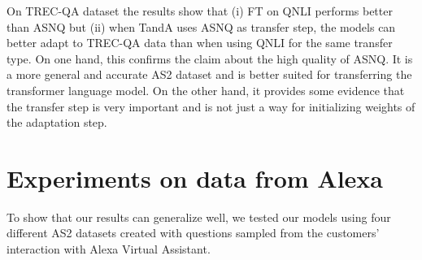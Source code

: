 \documentclass[letterpaper]{article} \usepackage{aaai20}  \usepackage{times}  \usepackage{helvet} \usepackage{courier}  \usepackage[hyphens]{url}  \usepackage{graphicx} \urlstyle{rm} \def\UrlFont{\rm}  \usepackage{graphicx}  \usepackage{todonotes}
\newcommand{\TANDA}{T{\sc and}A}
\begin{document}
On TREC-QA dataset the results show that (i) FT on QNLI performs better than ASNQ but (ii) when {\TANDA} uses ASNQ as transfer step, the models can better adapt to TREC-QA data than when using QNLI for the same transfer type.
On one hand, this confirms the claim about the high quality of ASNQ. It is a more general and accurate AS2 dataset and is better suited for transferring the transformer language model. On the other hand, it provides some evidence that the transfer step is very important and is not just a way for initializing  weights of the adaptation step.







\section{Experiments on data from Alexa}
\label{alexa}

To show that our results can generalize well, we tested our models using four different AS2 datasets created with questions sampled from the customers' interaction with Alexa Virtual Assistant.
\end{document}
